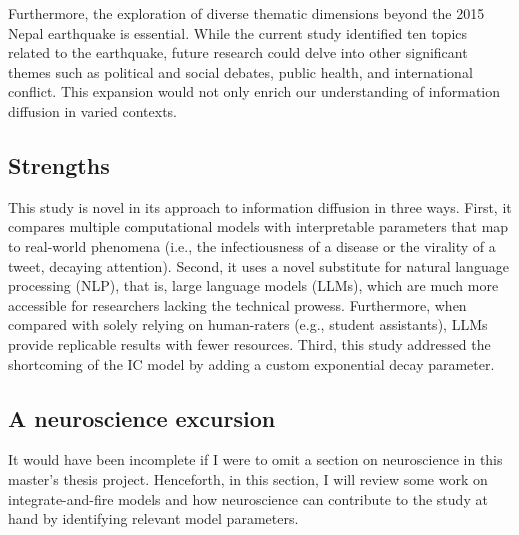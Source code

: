\documentclass[11pt,a4paper]{article}
\begin{document}
    Furthermore, the exploration of diverse thematic dimensions beyond the 2015 Nepal earthquake is essential. While the current study identified ten topics related to the earthquake, future research could delve into other significant themes such as political and social debates, public health, and international conflict. This expansion would not only enrich our understanding of information diffusion in varied contexts.
    
        \subsection{Strengths}
    This study is novel in its approach to information diffusion in three ways. First, it compares multiple computational models with interpretable parameters that map to real-world phenomena (i.e., the infectiousness of a disease or the virality of a tweet, decaying attention). Second, it uses a novel substitute for natural language processing (NLP), that is, large language models (LLMs), which are much more accessible for researchers lacking the technical prowess. Furthermore, when compared with solely relying on human-raters (e.g., student assistants), LLMs provide replicable results with fewer resources. Third, this study addressed the shortcoming of the IC model by adding a custom exponential decay parameter.

    \subsection{A neuroscience excursion}
    
    It would have been incomplete if I were to omit a section on neuroscience in this master's thesis project. Henceforth, in this section, I will review some work on integrate-and-fire models and how neuroscience can contribute to the study at hand by identifying relevant model parameters.
    
\end{document}

